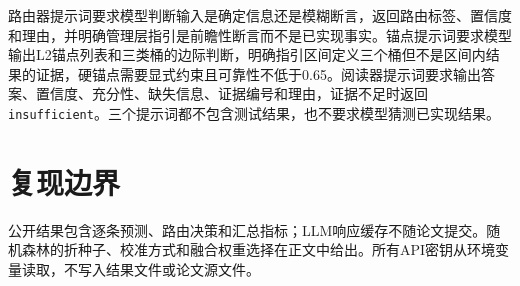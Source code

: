 路由器提示词要求模型判断输入是确定信息还是模糊断言，返回路由标签、置信度和理由，并明确管理层指引是前瞻性断言而不是已实现事实。锚点提示词要求模型输出L2锚点列表和三类桶的边际判断，明确指引区间定义三个桶但不是区间内结果的证据，硬锚点需要显式约束且可靠性不低于0.65。阅读器提示词要求输出答案、置信度、充分性、缺失信息、证据编号和理由，证据不足时返回\texttt{insufficient}。三个提示词都不包含测试结果，也不要求模型猜测已实现结果。

\section{复现边界}

公开结果包含逐条预测、路由决策和汇总指标；LLM响应缓存不随论文提交。随机森林的折种子、校准方式和融合权重选择在正文中给出。所有API密钥从环境变量读取，不写入结果文件或论文源文件。
